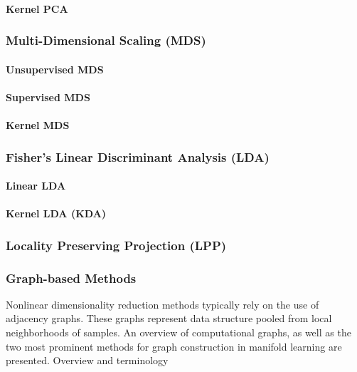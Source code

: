 \paragraph{Kernel PCA}

\subsubsection{Multi-Dimensional Scaling (MDS)}

\paragraph{Unsupervised MDS}

\paragraph{Supervised MDS}

\paragraph{Kernel MDS}

\subsubsection{Fisher's Linear Discriminant Analysis (LDA)}

\paragraph{Linear LDA}

\paragraph{Kernel LDA (KDA)}

\subsubsection{Locality Preserving Projection (LPP)}


\subsubsection{Graph-based Methods}
Nonlinear dimensionality reduction methods typically rely on the use of adjacency graphs.  These graphs represent data structure pooled from local neighborhoods of samples.  An overview of computational graphs, as well as the two most prominent methods for graph construction in manifold learning are presented.
Overview and terminology

